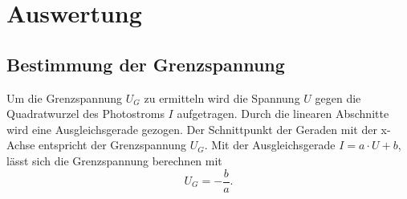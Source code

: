 \section{Auswertung}
\label{sec:Auswertung}

%
%

\subsection{Bestimmung der Grenzspannung}

Um die Grenzspannung $U_G$ zu ermitteln wird die Spannung $U$ gegen die Quadratwurzel des Photostroms $I$ aufgetragen. 
Durch die linearen Abschnitte wird eine Ausgleichsgerade gezogen.
Der Schnittpunkt der Geraden mit der x-Achse entspricht der Grenzspannung $U_G$.
Mit der Ausgleichsgerade $I = a \cdot U + b$, lässt sich die Grenzspannung berechnen mit
\begin{equation*}
  U_G = - \frac{b}{a}.
\end{equation*}
\\
\\
